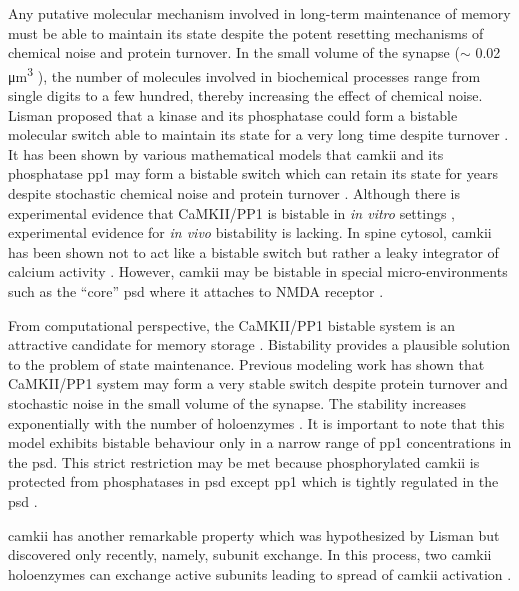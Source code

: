 \documentclass[9pt,lineno,doublespacing]{elife}
\begin{document}
Any putative molecular mechanism involved in long-term maintenance of memory
must be able to maintain its state despite the potent resetting mechanisms of
chemical noise and protein turnover.  In the small volume of the synapse ($\sim$
0.02 \si{\micro\meter^3} \citep{bartol_nanoconnectomic_2015}), the number of
molecules involved in biochemical processes range from single digits to a few
hundred, thereby increasing the effect of chemical noise.  Lisman proposed that
a kinase and its phosphatase could form a bistable molecular switch able to
maintain its state for a very long time despite turnover
\citep{lisman_mechanism_1985}. It has been shown by various mathematical models
that \gls{camkii} and its phosphatase \gls{pp1} may form a bistable switch
\citep{sandstorm_models_2004,zhabotinsky_bistability_2000} which can retain its
state for years despite stochastic chemical noise and protein turnover
\citep{miller_stability_2005}. Although there is experimental evidence that
CaMKII/PP1 is bistable in \emph{in vitro} settings
\citep{bradshaw_ultrasensitive_2003,urakubo_vitro_2014}, experimental evidence
for \emph{in vivo} bistability is lacking. In spine cytosol, \gls{camkii} has
been shown not to act like a bistable switch but rather a leaky integrator of
calcium activity \citep{chang_camkii_2017}.  However, \gls{camkii} may be
bistable in special micro-environments such as the ``core'' \gls{psd} where it
attaches to NMDA receptor \citep{dosemeci_postsynaptic_2016,
petersen_distribution_2003}.

From computational perspective, the CaMKII/PP1 bistable system is an attractive
candidate for memory storage \citep{koch_biophysics_2004}.  Bistability provides
a plausible solution to the problem of state maintenance. Previous modeling work
has shown that CaMKII/PP1 system may form a very stable switch despite protein
turnover and stochastic noise in the small volume of the synapse.  The stability
increases exponentially with the number of holoenzymes
\citep{miller_stability_2005}. It is important to note that this model exhibits
bistable behaviour only in a narrow range of \gls{pp1} concentrations in the
\gls{psd}. This strict restriction may be met because phosphorylated
\gls{camkii} is protected from phosphatases in \gls{psd} except \gls{pp1}
\citep{strack_differential_1997} which is tightly regulated in the \gls{psd}
\citep{bollen_extended_2010}. 

\gls{camkii} has another remarkable property which was hypothesized by Lisman
\citep{lisman_cam_1994} but discovered only recently, namely, subunit exchange.
In this process, two \gls{camkii} holoenzymes can exchange active subunits
leading to spread of \gls{camkii} activation \citep{stratton_activation-triggered_2014}.
\end{document}
